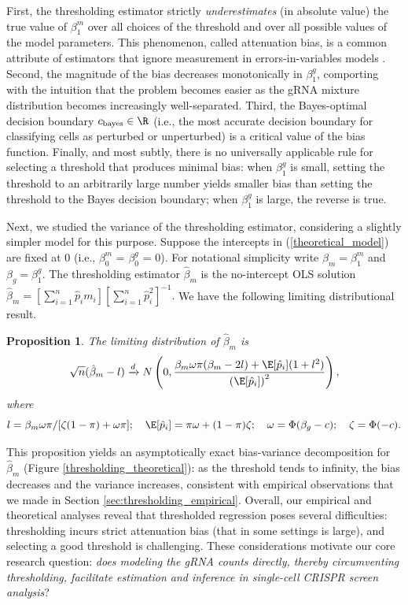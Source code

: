 \documentclass[11pt]{article}
\newtheorem{proposition}{Proposition}
\begin{document}
First, the thresholding estimator strictly \textit{underestimates} (in absolute value) the true value of $\beta^m_1$ over all choices of the threshold and over all possible values of the model parameters. This phenomenon, called attenuation bias, is a common attribute of estimators that ignore measurement in errors-in-variables models \cite{Stefanski2000a}. Second, the magnitude of the bias decreases monotonically in $\beta^g_1$, comporting with the intuition that the problem becomes easier as the gRNA mixture distribution becomes increasingly well-separated. Third, the Bayes-optimal decision boundary $c_\textrm{bayes} \in \R$ (i.e., the most accurate decision boundary for classifying cells as perturbed or unperturbed) is a critical value of the bias function. Finally, and most subtly, there is no universally applicable rule for selecting a threshold that produces minimal bias: when $\beta^g_1$ is small, setting the threshold to an arbitrarily large number yields smaller bias than setting the threshold to the Bayes decision boundary; when $\beta^g_1$ is large, the reverse is true.

Next, we studied the variance of the thresholding estimator, considering a slightly simpler model for this purpose. Suppose the intercepts in (\ref{theoretical_model}) are fixed at $0$ (i.e., $\beta^m_0$ = $\beta^g_0$ = 0). For notational simplicity write $\beta_m = \beta^m_1$ and $\beta_g = \beta^g_1.$ The thresholding estimator $\hat{\beta}_m$ is the no-intercept OLS solution $\hat{\beta}_m = \left[\sum_{i=1}^n \hat{p}_i m_i \right]\left[\sum_{i=1}^n \hat{p}_i^2 \right]^{-1}.$ We have the following limiting distributional result.
\begin{proposition}\label{prop:bv_decomp}
	The limiting distribution of $\hat{\beta}_m$ is
	$$\sqrt{n}(\hat{\beta}_m - l) \xrightarrow{d} N\left(0, \frac{ \beta_m \omega\pi(\beta_m - 2l) + \E[\hat{p}_i](1 + l^2) }{\left(\E[\hat{p}_i]\right)^2} \right),$$ where $$l = \beta_m \omega \pi/[\zeta(1-\pi) + \omega \pi]; \quad
	\E[\hat{p}_i] = \pi \omega + (1-\pi) \zeta; \quad
	\omega = \Phi(\beta_g - c); \quad
	\zeta = \Phi(-c).$$
\end{proposition}
This proposition yields an asymptotically exact bias-variance decomposition for $\hat{\beta}_m$ (Figure \ref{thresholding_theoretical}): as the threshold tends to infinity, the bias decreases and the variance increases, consistent with empirical observations that we made in Section \ref{sec:thresholding_empirical}. Overall, our empirical and theoretical analyses reveal that thresholded regression poses several difficulties: thresholding incurs strict attenuation bias (that in some settings is large), and selecting a good threshold is challenging. These considerations motivate our core research question: \textit{does modeling the gRNA counts directly, thereby circumventing thresholding, facilitate estimation and inference in single-cell CRISPR screen analysis}?
\end{document}
